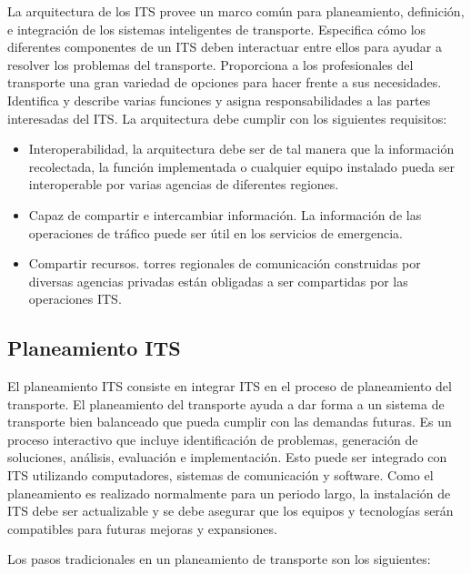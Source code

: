 La arquitectura de los ITS provee un marco común para planeamiento, definición, e integración de los sistemas inteligentes de transporte. Especifica cómo los diferentes componentes de un ITS deben interactuar entre ellos para ayudar a resolver los problemas del transporte. Proporciona a los profesionales del transporte una gran variedad de opciones para hacer frente a sus necesidades. Identifica y describe varias funciones y asigna responsabilidades a las partes interesadas del ITS. La arquitectura debe cumplir con los siguientes requisitos:
\begin{itemize}
\item Interoperabilidad, la arquitectura debe ser de tal manera que la información recolectada, la función implementada o cualquier equipo instalado pueda ser interoperable por varias agencias de diferentes regiones.

\item Capaz de compartir e intercambiar información. La información de las operaciones de tráfico puede ser útil en los servicios de emergencia.

\item Compartir recursos. torres regionales de comunicación construidas por diversas agencias privadas están obligadas a ser compartidas por las operaciones ITS.
\end{itemize}


\subsection{Planeamiento ITS}

El planeamiento ITS consiste en integrar ITS en el proceso de planeamiento del transporte. El planeamiento del transporte ayuda a dar forma a un sistema de transporte bien balanceado que pueda cumplir con las demandas futuras. Es un proceso interactivo que incluye identificación de problemas, generación de soluciones, análisis, evaluación e implementación. Esto puede ser integrado con ITS utilizando computadores, sistemas de comunicación y software. Como el planeamiento es realizado normalmente para un periodo largo, la instalación de ITS debe ser actualizable y se debe asegurar que los equipos y tecnologías serán compatibles para futuras mejoras y expansiones.

Los pasos tradicionales en un planeamiento de transporte son los siguientes:

